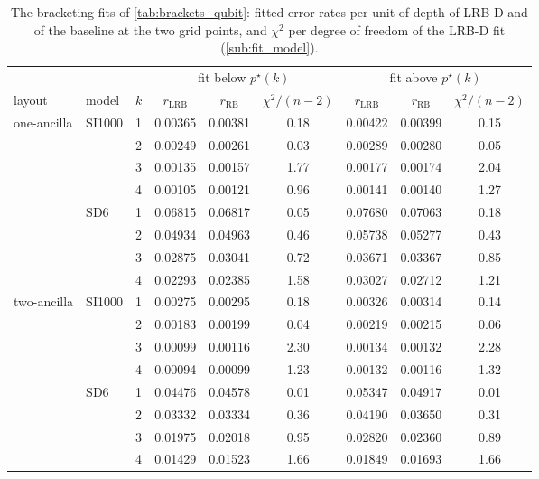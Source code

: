 \begin{table}[tp]
  \centering
  \footnotesize
  \setlength{\tabcolsep}{4pt}
  \begin{tabular}{llc|ccc|ccc}
    \hline
    & & & \multicolumn{3}{c|}{fit below $p^\star(k)$} & \multicolumn{3}{c}{fit above $p^\star(k)$} \\
    layout & model & $k$ & $r_{\mathrm{LRB}}$ & $r_{\mathrm{RB}}$ & $\chi^2/(n-2)$ & $r_{\mathrm{LRB}}$ & $r_{\mathrm{RB}}$ & $\chi^2/(n-2)$ \\
    \hline
    one-ancilla & SI1000 & 1 & 0.00365 & 0.00381 & 0.18 & 0.00422 & 0.00399 & 0.15 \\
     &  & 2 & 0.00249 & 0.00261 & 0.03 & 0.00289 & 0.00280 & 0.05 \\
     &  & 3 & 0.00135 & 0.00157 & 1.77 & 0.00177 & 0.00174 & 2.04 \\
     &  & 4 & 0.00105 & 0.00121 & 0.96 & 0.00141 & 0.00140 & 1.27 \\
    \hline
     & SD6 & 1 & 0.06815 & 0.06817 & 0.05 & 0.07680 & 0.07063 & 0.18 \\
     &  & 2 & 0.04934 & 0.04963 & 0.46 & 0.05738 & 0.05277 & 0.43 \\
     &  & 3 & 0.02875 & 0.03041 & 0.72 & 0.03671 & 0.03367 & 0.85 \\
     &  & 4 & 0.02293 & 0.02385 & 1.58 & 0.03027 & 0.02712 & 1.21 \\
    \hline
    two-ancilla & SI1000 & 1 & 0.00275 & 0.00295 & 0.18 & 0.00326 & 0.00314 & 0.14 \\
     &  & 2 & 0.00183 & 0.00199 & 0.04 & 0.00219 & 0.00215 & 0.06 \\
     &  & 3 & 0.00099 & 0.00116 & 2.30 & 0.00134 & 0.00132 & 2.28 \\
     &  & 4 & 0.00094 & 0.00099 & 1.23 & 0.00132 & 0.00116 & 1.32 \\
    \hline
     & SD6 & 1 & 0.04476 & 0.04578 & 0.01 & 0.05347 & 0.04917 & 0.01 \\
     &  & 2 & 0.03332 & 0.03334 & 0.36 & 0.04190 & 0.03650 & 0.31 \\
     &  & 3 & 0.01975 & 0.02018 & 0.95 & 0.02820 & 0.02360 & 0.89 \\
     &  & 4 & 0.01429 & 0.01523 & 1.66 & 0.01849 & 0.01693 & 1.66 \\
    \hline
  \end{tabular}
  \caption{The bracketing fits of \autoref{tab:brackets_qubit}: fitted error rates per unit of depth of LRB-D and of the baseline at the two grid points, and $\chi^2$ per degree of freedom of the LRB-D fit (\autoref{sub:fit_model}).}
  \label{tab:brackets_rates_qubit}
\end{table}


